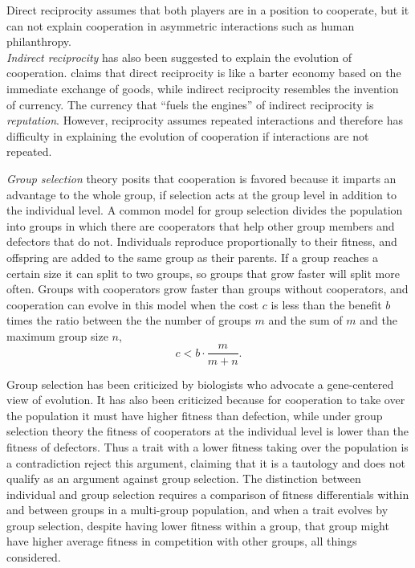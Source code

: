 \documentclass[12pt]{extarticle}
\begin{document}
Direct reciprocity assumes that both players are in a position to cooperate, but it can not explain cooperation in asymmetric interactions such as human philanthropy. \\
\emph{Indirect reciprocity} has also been suggested to explain the evolution of cooperation.
\citet{nowak2006five} claims that direct reciprocity is like a barter economy based on the immediate exchange of goods, while indirect reciprocity resembles the invention of currency. 
The currency that ``fuels the engines'' of indirect reciprocity is \emph{reputation}. 
However, reciprocity assumes repeated interactions and therefore has difficulty in explaining the evolution of cooperation if  interactions are not repeated. 

\emph{Group selection} theory posits that cooperation is favored because it imparts an advantage to the whole group, if selection acts at the group level in addition to the individual level. A common model for group selection divides the population into groups in which there are cooperators that help  other group members and defectors that do not.  %
Individuals reproduce proportionally to their fitness, and offspring are added to the same group as their parents.
If a group reaches a certain size it can split to two groups, so groups that grow faster will split more often.
Groups with cooperators grow faster than groups without cooperators, and
cooperation can evolve in this model when the cost $c$ is less than the benefit $b$ times the ratio between the  the number of groups $m$ and the sum of $m$ and the maximum group size $n$,
\begin{equation} \label{eq:groupselection}
c < b \cdot \frac{m}{m+n} .
\end{equation}

Group selection has been criticized by biologists who advocate a gene-centered view of evolution. %
It has also been criticized because for cooperation to take over the population it must have higher fitness than defection, while under group selection theory the fitness of cooperators at the individual level is lower than the fitness of defectors. Thus a trait with a lower fitness taking over the population is a contradiction %
\citet{eldakar2011eight} reject this argument, claiming that it is a tautology and does not qualify as an argument against group selection. The distinction between individual and group selection requires a comparison of fitness differentials within and between groups in a multi-group population, and when a trait  evolves by group selection, despite having lower fitness within a group, that group might have higher average fitness in competition with other groups, all things considered. %
\end{document}
